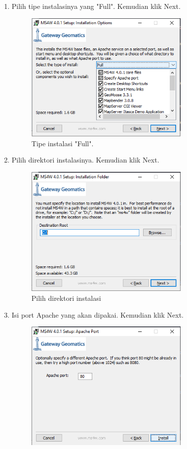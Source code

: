 \begin{enumerate}
	\item  Pilih tipe instalasinya yang "Full". Kemudian klik Next.
	\hfill\break
	\begin{figure}[H]
		\includegraphics[width=8cm]{figures/Tugas4/1174083/pic4.png}
		\centering
		\caption{Tipe instalasi "Full".}
	\end{figure}
	\item  Pilih direktori instalasinya. Kemudian klik Next.
	\hfill\break
	\begin{figure}[H]
		\includegraphics[width=8cm]{figures/Tugas4/1174083/pic5.png}
		\centering
		\caption{Pilih direktori instalasi}
	\end{figure}
	\item  Isi port Apache yang akan dipakai. Kemudian klik Next.
	\hfill\break
	\begin{figure}[H]
		\includegraphics[width=8cm]{figures/Tugas4/1174083/pic6.png}

\end{figure}
\end{enumerate}
